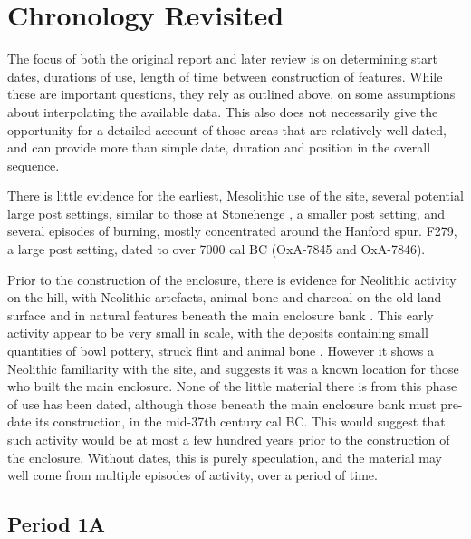 \section{Chronology Revisited} 
The focus of both the original report \citep{Mercer:2008fk} and later review \citet{Whittle:2011kl} is on determining start dates, durations of use, length of time between construction of features. While these are important questions, they rely as outlined above, on some assumptions about interpolating the available data. This also does not necessarily give the opportunity for a detailed account of those areas that are relatively well dated, and can provide more than simple date, duration and position in the overall sequence. 

There is little evidence for the earliest, Mesolithic use of the site, several potential large post settings, similar to those at Stonehenge \citep[48]{Mercer:2008fk}, a smaller post setting, and several episodes of burning, mostly concentrated around the Hanford spur. F279, a large post setting, dated to over 7000 cal BC (OxA-7845 and OxA-7846).

Prior to the construction of the enclosure, there is evidence for Neolithic activity on the hill, with Neolithic artefacts, animal bone and charcoal on the old land surface and in natural features beneath the main enclosure bank \citep[138]{Whittle:2011kl}. This early activity appear to be very small in scale, with the deposits containing small quantities of bowl pottery, struck flint and animal bone \citep[54]{Mercer:2008fk}. However it shows a Neolithic familiarity with the site, and suggests it was a known location for those who built the main enclosure. None of the little material there is from this phase of use has been dated, although those beneath the main enclosure bank must pre-date its construction, in the mid-37th century cal BC. This would suggest that such activity would be at most a few hundred years prior to the construction of the enclosure. Without dates, this is purely speculation, and the material may well come from multiple episodes of activity, over a period of time.

\subsection{Period 1A}
